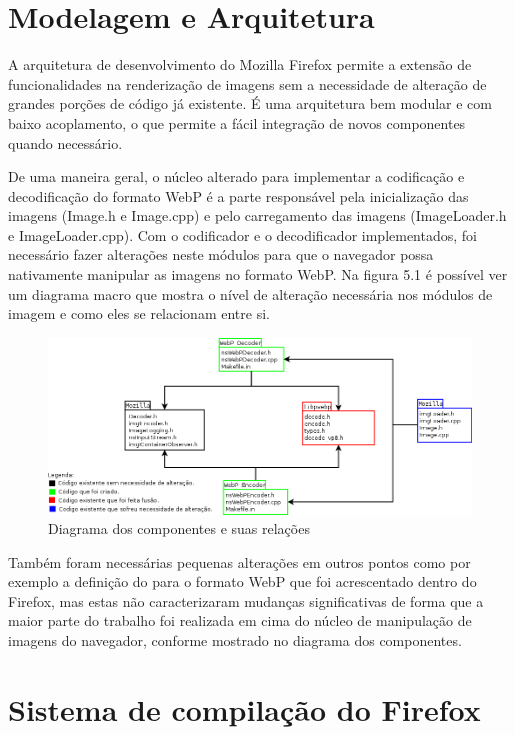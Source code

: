 \documentclass[espaco=simples,appendix=Name]{abnt}
\begin{document}
\section{Modelagem e Arquitetura}

A arquitetura de desenvolvimento do Mozilla Firefox permite a extensão de funcionalidades na renderização de imagens sem a necessidade de alteração de grandes porções de código já existente. É uma arquitetura bem modular e com baixo acoplamento, o que permite a fácil integração de novos componentes quando necessário. 

De uma maneira geral, o núcleo alterado para implementar a codificação e decodificação do formato WebP é a parte responsável pela inicialização das imagens (Image.h e Image.cpp) e pelo carregamento das imagens (ImageLoader.h e ImageLoader.cpp). Com o codificador e o decodificador implementados, foi necessário fazer alterações neste módulos para que o navegador possa nativamente manipular as imagens no formato WebP. Na figura 5.1 é possível ver um diagrama macro que mostra o nível de alteração necessária nos módulos de imagem e como eles se relacionam entre si.

\begin{figure}[h]
  \centering
    \includegraphics[scale=0.45]{Arquitetura.png}
  \caption{Diagrama dos componentes e suas relações}
\end{figure}

Também foram necessárias pequenas alterações em outros pontos como por exemplo a definição do  para o formato WebP que foi acrescentado dentro do Firefox, mas estas não caracterizaram mudanças significativas de forma que a maior parte do trabalho foi realizada em cima do núcleo de manipulação de imagens do navegador, conforme mostrado no diagrama dos componentes.

\section{Sistema de compilação do Firefox}
\end{document}
